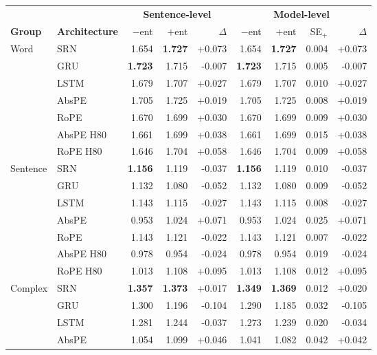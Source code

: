 \begin{table}[t]
\centering\scriptsize
\begin{tabular}{@{}llrrrrrrr@{}}
\toprule
 &  & \multicolumn{3}{c}{\textbf{Sentence-level}} & \multicolumn{4}{c}{\textbf{Model-level}} \\
\cmidrule(lr){3-5} \cmidrule(lr){6-9}
\textbf{Group} & \textbf{Architecture} & $-$ent & $+$ent & $\Delta$ & $-$ent & $+$ent & SE$_{+}$ & $\Delta$ \\
\midrule
Word & SRN & 1.654 & \textbf{1.727} & +0.073 & 1.654 & \textbf{1.727} & 0.004 & +0.073 \\
 & GRU & \textbf{1.723} & 1.715 & -0.007 & \textbf{1.723} & 1.715 & 0.005 & -0.007 \\
 & LSTM & 1.679 & 1.707 & +0.027 & 1.679 & 1.707 & 0.010 & +0.027 \\
 & AbsPE & 1.705 & 1.725 & +0.019 & 1.705 & 1.725 & 0.008 & +0.019 \\
 & RoPE & 1.670 & 1.699 & +0.030 & 1.670 & 1.699 & 0.009 & +0.030 \\
 & AbsPE H80 & 1.661 & 1.699 & +0.038 & 1.661 & 1.699 & 0.015 & +0.038 \\
 & RoPE H80 & 1.646 & 1.704 & +0.058 & 1.646 & 1.704 & 0.009 & +0.058 \\
\addlinespace
Sentence & SRN & \textbf{1.156} & 1.119 & -0.037 & \textbf{1.156} & 1.119 & 0.010 & -0.037 \\
 & GRU & 1.132 & 1.080 & -0.052 & 1.132 & 1.080 & 0.009 & -0.052 \\
 & LSTM & 1.143 & 1.115 & -0.027 & 1.143 & 1.115 & 0.008 & -0.027 \\
 & AbsPE & 0.953 & 1.024 & +0.071 & 0.953 & 1.024 & 0.025 & +0.071 \\
 & RoPE & 1.143 & 1.121 & -0.022 & 1.143 & 1.121 & 0.007 & -0.022 \\
 & AbsPE H80 & 0.978 & 0.954 & -0.024 & 0.978 & 0.954 & 0.019 & -0.024 \\
 & RoPE H80 & 1.013 & 1.108 & +0.095 & 1.013 & 1.108 & 0.012 & +0.095 \\
\addlinespace
Complex & SRN & \textbf{1.357} & \textbf{1.373} & +0.017 & \textbf{1.349} & \textbf{1.369} & 0.012 & +0.020 \\
 & GRU & 1.300 & 1.196 & -0.104 & 1.290 & 1.185 & 0.032 & -0.105 \\
 & LSTM & 1.281 & 1.244 & -0.037 & 1.273 & 1.239 & 0.020 & -0.034 \\
 & AbsPE & 1.054 & 1.099 & +0.046 & 1.041 & 1.082 & 0.042 & +0.042 \\

\end{tabular}
\end{table}
